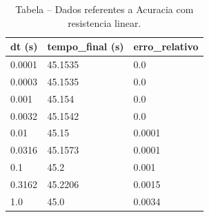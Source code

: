 \begin{table}[H]
\centering
\caption{Tabela – Dados referentes a Acuracia com resistencia linear.}
\label{tab:acuracia_com_resistencia_linear}
\begin{tabular}{lll}
\toprule
dt (s) & tempo\_final (s) & erro\_relativo \\
\midrule
0.0001 & 45.1535 & 0.0 \\
0.0003 & 45.1535 & 0.0 \\
0.001 & 45.154 & 0.0 \\
0.0032 & 45.1542 & 0.0 \\
0.01 & 45.15 & 0.0001 \\
0.0316 & 45.1573 & 0.0001 \\
0.1 & 45.2 & 0.001 \\
0.3162 & 45.2206 & 0.0015 \\
1.0 & 45.0 & 0.0034 \\
\bottomrule
\end{tabular}

\end{table}
